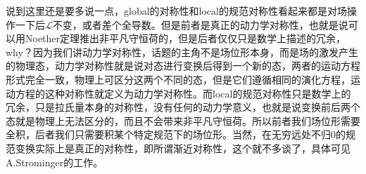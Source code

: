 \begin{remark}
	说到这里还是要多说一点，global的对称性和local的规范对称性看起来都是对场操作一下后$\mathcal{L}$不变，或者差个全导数。但是前者是真正的动力学对称性，也就是说可以用Noether定理推出非平凡守恒荷的，但是后者仅仅只是数学上描述的冗余，why？因为我们讲动力学对称性，话题的主角不是场位形本身，而是场的激发产生的物理态，动力学对称性就是说对态进行变换后得到一个新的态，两者的运动方程形式完全一致，物理上可区分这两个不同的态，但是它们遵循相同的演化方程，运动方程的这种对称性就定义为动力学对称性。而local的规范对称性只是数学上的冗余，只是拉氏量本身的对称性，没有任何的动力学意义，也就是说变换前后两个态就是物理上无法区分的，而且不会带来非平凡守恒荷。所以前者我们场位形需要全积，后者我们只需要积某个特定规范下的场位形。当然，在无穷远处不归0的规范变换实际上是真正的对称性，即所谓渐近对称性，这个就不多谈了，具体可见A.Strominger的工作。
\end{remark}

